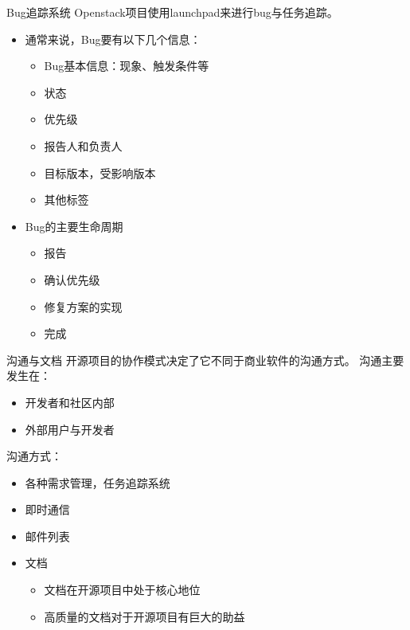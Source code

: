 \documentclass{beamer}
\begin{document}
\begin{frame}[label={sec:orgf66b3fc}]{Bug追踪系统}
Openstack项目使用launchpad来进行bug与任务追踪。
\begin{itemize}
\item 通常来说，Bug要有以下几个信息：
\begin{itemize}
\item Bug基本信息：现象、触发条件等
\item 状态
\item 优先级
\item 报告人和负责人
\item 目标版本，受影响版本
\item 其他标签
\end{itemize}

\item Bug的主要生命周期
\begin{itemize}
\item 报告
\item 确认优先级
\item 修复方案的实现
\item 完成
\end{itemize}
\end{itemize}
\end{frame}

\begin{frame}[label={sec:org296ec85}]{沟通与文档}
开源项目的协作模式决定了它不同于商业软件的沟通方式。
沟通主要发生在：
\begin{itemize}
\item 开发者和社区内部
\item 外部用户与开发者
\end{itemize}
沟通方式：
\begin{itemize}
\item 各种需求管理，任务追踪系统
\item 即时通信
\item 邮件列表
\item 文档
\begin{itemize}
\item 文档在开源项目中处于核心地位
\item 高质量的文档对于开源项目有巨大的助益
\end{itemize}
\end{itemize}
\end{frame}
\end{document}
